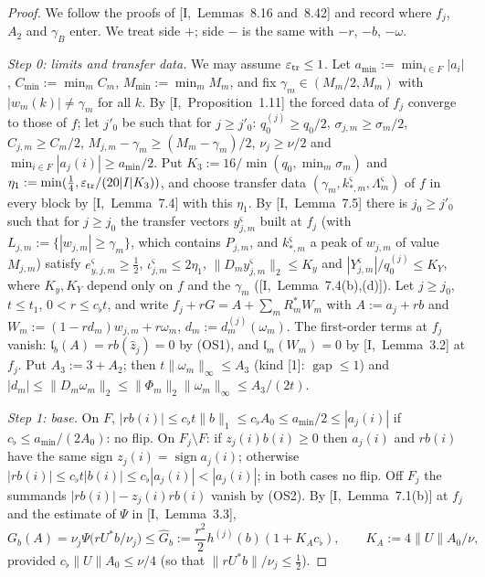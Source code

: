 \documentclass[10pt]{amsart}
\theoremstyle{definition}
\theoremstyle{remark}
\newcommand{\sgn}{\operatorname{sign}}
\newcommand{\gap}{\operatorname{gap}}
\newcommand{\zh}{\hat z}
\newcommand{\lin}{\mathfrak l}
\begin{document}
\begin{proof}
We follow the proofs of [I,~Lemmas~8.16 and~8.42] and record where $f_j$,
$A_2$ and $\gamma_B$ enter.  We treat side $+$; side $-$ is the same with
$-r$, $-b$, $-\omega$.

\emph{Step 0: limits and transfer data.}  We may assume $\varepsilon_{\rm tr}\le1$.  Let $a_{\min}:=\min_{i\in F}|a_i|$,
$C_{\min}:=\min_mC_m$, $M_{\min}:=\min_mM_m$, and fix $\gamma_m\in(M_m/2,M_m)$
with $|w_m(k)|\ne\gamma_m$ for all $k$.  By [I,~Proposition~1.11] the forced
data of $f_j$ converge to those of $f$; let $j'_0$ be such that for $j\ge
j'_0$: $q^{(j)}_0\ge q_0/2$, $\sigma_{j,m}\ge\sigma_m/2$, $C_{j,m}\ge C_m/2$,
$M_{j,m}-\gamma_m\ge(M_m-\gamma_m)/2$, $\nu_j\ge\nu/2$ and $\min_{i\in F}
|a_j(i)|\ge a_{\min}/2$.  Put $K_3:=16/\min(q_0,\min_m\sigma_m)$ and
$\eta_1:=\min(\frac14,\varepsilon_{\rm tr}/(20|I|K_3))$, and choose transfer
data $(\gamma_m,k^\varsigma_{*,m},\Lambda^\varsigma_m)$ of $f$ in every block
by [I,~Lemma~7.4] with this $\eta_1$.  By [I,~Lemma~7.5] there is $j_0\ge
j'_0$ such that for $j\ge j_0$ the transfer vectors $y^\varsigma_{j,m}$
built at $f_j$ (with $L_{j,m}:=\{|w_{j,m}|\ge\gamma_m\}$, which contains
$P_{j,m}$, and $k^\varsigma_{*,m}$ a peak of $w_{j,m}$ of value $M_{j,m}$)
satisfy $e^\varsigma_{y,j,m}\ge\frac12$, $\iota^\varsigma_{j,m}\le2\eta_1$,
$\|D_my^\varsigma_{j,m}\|_2\le K_y$ and $|Y^\varsigma_{j,m}|/q^{(j)}_0\le K_Y$,
where $K_y,K_Y$ depend only on $f$ and the $\gamma_m$
([I,~Lemma~7.4(b),(d)]).  Let $j\ge j_0$, $t\le t_1$, $0<r\le c_\flat t$,
and write $f_j+rG=A+\sum_mR_m^*W_m$ with $A:=a_j+rb$ and $W_m:=
(1-rd_m)w_{j,m}+r\omega_m$, $d_m:=d^{(j)}_m(\omega_m)$.  The first-order terms
at $f_j$ vanish: $\lin_b(A)=rb(\zh_j)=0$ by (OS1), and $\lin_m(W_m)=0$ by
[I,~Lemma~3.2] at $f_j$.  Put $A_3:=3+A_2$; then $t\|\omega_m\|_\infty\le
A_3$ (kind [1]: $\gap\le1$) and $|d_m|\le\|D_m\omega_m\|_2\le\|\Phi_m\|_2
\|\omega_m\|_\infty\le A_3/(2t)$.

\emph{Step 1: base.}  On $F$, $|rb(i)|\le c_\flat t\|b\|_1\le c_\flat A_0\le
a_{\min}/2\le|a_j(i)|$ if $c_\flat\le a_{\min}/(2A_0)$: no flip.  On
$F_j\setminus F$: if $z_j(i)b(i)\ge0$ then $a_j(i)$ and $rb(i)$ have the
same sign $z_j(i)=\sgn a_j(i)$; otherwise $|rb(i)|\le c_\flat t|b(i)|\le
c_\flat|a_j(i)|<|a_j(i)|$; in both cases no flip.  Off $F_j$ the summands
$|rb(i)|-z_j(i)rb(i)$ vanish by (OS2).  By [I,~Lemma~7.1(b)] at $f_j$ and the
estimate of $\Psi$ in [I,~Lemma~3.3],
\[
 G_b(A)=\nu_j\Psi\big(rU^*b/\nu_j\big)\le\hat G_b:=\frac{r^2}2h^{(j)}(b)
 (1+K_Ac_\flat),\qquad K_A:=4\|U\|A_0/\nu,
\]
provided $c_\flat\|U\|A_0\le\nu/4$ (so that $\|rU^*b\|/\nu_j\le\frac12$).


\end{proof}
\end{document}
